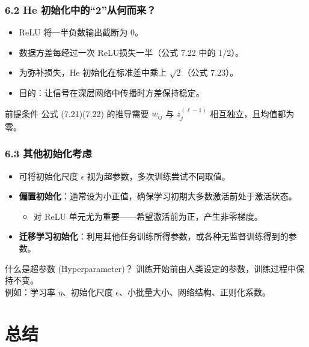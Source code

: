 \documentclass[t,aspectratio=169]{beamer} %
\begin{document}
\begin{frame}
    \frametitle{6.2 He 初始化中的“2”从何而来？}
    \begin{itemize}
        \item ReLU 将一半负数输出截断为 0。
        \item 数据方差每经过一次 ReLU\alert{损失一半}（公式 7.22 中的 $1/2$）。
        \item 为弥补损失，He 初始化在标准差中乘上 $\sqrt{2}$（公式 7.23）。
        \item 目的：让信号在深层网络中传播时\alert{方差保持稳定}。
    \end{itemize}
    \begin{block}{前提条件}
        公式 (7.21)(7.22) 的推导需要 $w_{ij}$ 与 $z_j^{(\ell-1)}$ \alert{相互独立}，且\alert{均值都为零}。
    \end{block}
\end{frame}

\begin{frame}
    \frametitle{6.3 其他初始化考虑}
    \begin{itemize}
        \item 可将初始化尺度 $\epsilon$ 视为\alert{超参数}，多次训练尝试不同取值。
        \item \textbf{偏置初始化}：通常设为\alert{小正值}，确保学习初期大多数激活前处于激活状态。
        \begin{itemize}
            \item 对 ReLU 单元尤为重要——希望激活前为正，产生非零梯度。
        \end{itemize}
        \item \textbf{迁移学习初始化}：利用其他任务训练所得参数，或各种无监督训练得到的参数。
    \end{itemize}
    \begin{block}{什么是超参数 (Hyperparameter)？}
        训练开始前由人类设定的参数，训练过程中保持不变。\\
        例如：学习率 $\eta$、初始化尺度 $\epsilon$、小批量大小、网络结构、正则化系数。
    \end{block}
\end{frame}

\section{总结}
\end{document}
